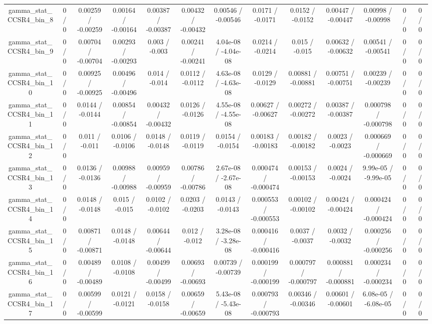 \documentclass[10pt]{article}
\begin{document}
\begin{table}[htbp]
\begin{center}
\begin{tabular}{|c|c|c|c|c|c|c|c|c|c|c|c|c|}
  gamma_stat_CCSR4_bin_8 & 0 / 0 & 0.00259 / -0.00259 & 0.00164 / -0.00164 & 0.00387 / -0.00387 & 0.00432 / -0.00432 & 0.00546 / -0.00546 & 0.0171 / -0.0171 & 0.0152 / -0.0152 & 0.00447 / -0.00447 & 0.00998 / -0.00998 & 0 / 0 & 0 / 0 \\ 
  gamma_stat_CCSR4_bin_9 & 0 / 0 & 0.00704 / -0.00704 & 0.00293 / -0.00293 & 0.003 / -0.003 & 0.00241 / -0.00241 & 4.04e-08 / -4.04e-08 & 0.0214 / -0.0214 & 0.015 / -0.015 & 0.00632 / -0.00632 & 0.00541 / -0.00541 & 0 / 0 & 0 / 0 \\ 
  gamma_stat_CCSR4_bin_10 & 0 / 0 & 0.00925 / -0.00925 & 0.00496 / -0.00496 & 0.014 / -0.014 & 0.0112 / -0.0112 & 4.63e-08 / -4.63e-08 & 0.0129 / -0.0129 & 0.00881 / -0.00881 & 0.00751 / -0.00751 & 0.00239 / -0.00239 & 0 / 0 & 0 / 0 \\ 
  gamma_stat_CCSR4_bin_11 & 0 / 0 & 0.0144 / -0.0144 & 0.00854 / -0.00854 & 0.00432 / -0.00432 & 0.0126 / -0.0126 & 4.55e-08 / -4.55e-08 & 0.00627 / -0.00627 & 0.00272 / -0.00272 & 0.00387 / -0.00387 & 0.000798 / -0.000798 & 0 / 0 & 0 / 0 \\ 
  gamma_stat_CCSR4_bin_12 & 0 / 0 & 0.011 / -0.011 & 0.0106 / -0.0106 & 0.0148 / -0.0148 & 0.0119 / -0.0119 & 0.0154 / -0.0154 & 0.00183 / -0.00183 & 0.00182 / -0.00182 & 0.0023 / -0.0023 & 0.000669 / -0.000669 & 0 / 0 & 0 / 0 \\ 
  gamma_stat_CCSR4_bin_13 & 0 / 0 & 0.0136 / -0.0136 & 0.00988 / -0.00988 & 0.00959 / -0.00959 & 0.00786 / -0.00786 & 2.67e-08 / -2.67e-08 & 0.000474 / -0.000474 & 0.00153 / -0.00153 & 0.0024 / -0.0024 & 9.99e-05 / -9.99e-05 & 0 / 0 & 0 / 0 \\ 
  gamma_stat_CCSR4_bin_14 & 0 / 0 & 0.0148 / -0.0148 & 0.015 / -0.015 & 0.0102 / -0.0102 & 0.0203 / -0.0203 & 0.0143 / -0.0143 & 0.000553 / -0.000553 & 0.00102 / -0.00102 & 0.00424 / -0.00424 & 0.000424 / -0.000424 & 0 / 0 & 0 / 0 \\ 
  gamma_stat_CCSR4_bin_15 & 0 / 0 & 0.00871 / -0.00871 & 0.0148 / -0.0148 & 0.00644 / -0.00644 & 0.012 / -0.012 & 3.28e-08 / -3.28e-08 & 0.000416 / -0.000416 & 0.0037 / -0.0037 & 0.0032 / -0.0032 & 0.000256 / -0.000256 & 0 / 0 & 0 / 0 \\ 
  gamma_stat_CCSR4_bin_16 & 0 / 0 & 0.00489 / -0.00489 & 0.0108 / -0.0108 & 0.00499 / -0.00499 & 0.00693 / -0.00693 & 0.00739 / -0.00739 & 0.000199 / -0.000199 & 0.000797 / -0.000797 & 0.000881 / -0.000881 & 0.000234 / -0.000234 & 0 / 0 & 0 / 0 \\ 
  gamma_stat_CCSR4_bin_17 & 0 / 0 & 0.00599 / -0.00599 & 0.0121 / -0.0121 & 0.0158 / -0.0158 & 0.00659 / -0.00659 & 5.43e-08 / -5.43e-08 & 0.000793 / -0.000793 & 0.00346 / -0.00346 & 0.00601 / -0.00601 & 6.08e-05 / -6.08e-05 & 0 / 0 & 0 / 0 \\ 

\end{tabular}
\end{center}
\end{table}
\end{document}
